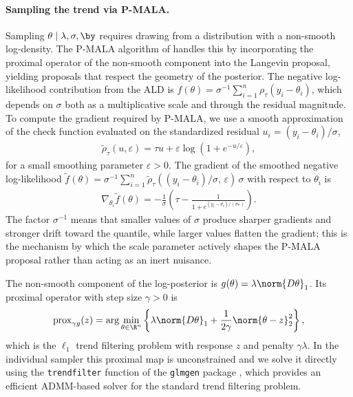 \paragraph{Sampling the trend via P-MALA.}
Sampling $\theta \mid \lambda, \sigma, \by$ requires drawing from a distribution with a non-smooth log-density. The P-MALA algorithm of \citet{pereyra2016proximal} handles this by incorporating the proximal operator of the non-smooth component into the Langevin proposal, yielding proposals that respect the geometry of the posterior. The negative log-likelihood contribution from the ALD is $f(\theta) = \sigma^{-1}\sum_{i=1}^n \rho_\tau(y_i - \theta_i)$, which depends on $\sigma$ both as a multiplicative scale and through the residual magnitude. To compute the gradient required by P-MALA, we use a smooth approximation of the check function evaluated on the standardized residual $u_i = (y_i - \theta_i)/\sigma$,
\begin{align*}
    \tilde{\rho}_\tau(u, \varepsilon) =
    \tau u + \varepsilon \log\!\left(1 + e^{-u/ \varepsilon}\right),
\end{align*}
for a small smoothing parameter $\varepsilon > 0$. The gradient of the smoothed negative log-likelihood $\tilde{f}(\theta) = \sigma^{-1}\sum_{i=1}^n \tilde{\rho}_\tau((y_i - \theta_i)/\sigma,\, \varepsilon)\,\sigma$ with respect to $\theta_i$ is
\begin{align*}
    \nabla_{\theta_i} \tilde{f}(\theta)
    = -\frac{1}{\sigma}\left(\tau -
    \frac{1}{1 + e^{(y_i - \theta_i)/(\sigma \varepsilon)}}\right).
\end{align*}
The factor $\sigma^{-1}$ means that smaller values of $\sigma$ produce sharper gradients and stronger drift toward the quantile, while larger values flatten the gradient; this is the mechanism by which the scale parameter actively shapes the P-MALA proposal rather than acting as an inert nuisance.

The non-smooth component of the log-posterior is $g(\theta) = \lambda \norm{D\theta}_1$. Its proximal operator with step size $\gamma > 0$ is
\begin{align*}
    \mathrm{prox}_{\gamma g}(z)
    = \arg\min_{\theta \in \R^n}
    \left\{\lambda \norm{D\theta}_1
    + \frac{1}{2\gamma}\norm{\theta - z}_2^2\right\},
\end{align*}
which is the $\ell_1$ trend filtering problem with response $z$ and penalty $\gamma\lambda$. In the individual sampler this proximal map is unconstrained and we solve it directly using the \texttt{trendfilter} function of the \texttt{glmgen} package \citep{tibshirani2014adaptive}, which provides an efficient ADMM-based solver for the standard trend filtering problem.

